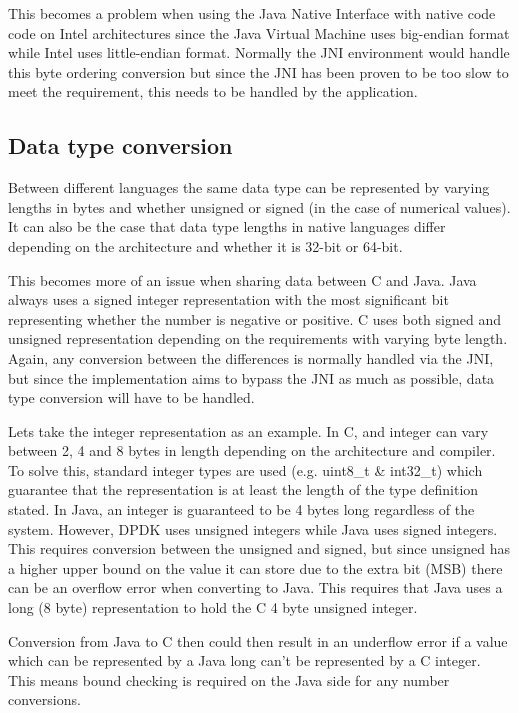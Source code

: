 \documentclass[final_report.tex]{subfiles}
\begin{document}
This becomes a problem when using the Java Native Interface with native code code on Intel architectures since the Java Virtual Machine uses big-endian format while Intel uses little-endian format. Normally the JNI environment would handle this byte ordering conversion but since the JNI has been proven to be too slow  to meet the requirement, this needs to be handled by the application.

\subsection{Data type conversion}
Between different languages the same data type can be represented by varying lengths in bytes and whether unsigned or signed (in the case of numerical values). It can also be the case that data type lengths in native languages differ depending on the architecture and whether it is 32-bit or 64-bit.

This becomes more of an issue when sharing data between C and Java. Java always uses a signed integer representation with the most significant bit representing whether the number is negative or positive. C uses both signed and unsigned representation depending on the requirements with varying byte length. Again, any conversion between the differences is normally handled via the JNI, but since the implementation aims to bypass the JNI as much as possible, data type conversion will have to be handled.

Lets take the integer representation as an example. In C, and integer can vary between 2, 4 and 8 bytes in length depending on the architecture and compiler. To solve this, standard integer types are used (e.g. uint8\_t \& int32\_t) which guarantee that the representation is at least the length of the type definition stated. In Java, an integer is guaranteed to be 4 bytes long regardless of the system. However, DPDK uses unsigned integers while Java uses signed integers. This requires conversion between the unsigned and signed, but since unsigned has a higher upper bound on the value it can store due to the extra bit (MSB) there can be an overflow error when converting to Java. This requires that Java uses a long (8 byte) representation to hold the C 4 byte unsigned integer.

Conversion from Java to C then could then result in an underflow error if a value which can be represented by a Java long can't be represented by a C integer. This means bound checking is required on the Java side for any number conversions.
\end{document}
